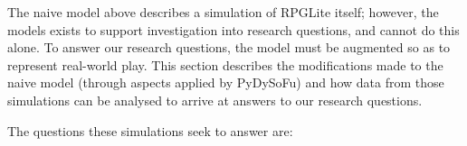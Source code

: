 
The naive model above describes a simulation of RPGLite itself; however, the
models exists to support investigation into research questions, and cannot do
this alone. To answer our research questions, the model must be augmented so as
to represent real-world play. This section describes the modifications made to
the naive model (through aspects applied by PyDySoFu) and how data from those
simulations can be analysed to arrive at answers to our research questions. 

The questions these simulations seek to answer are:

